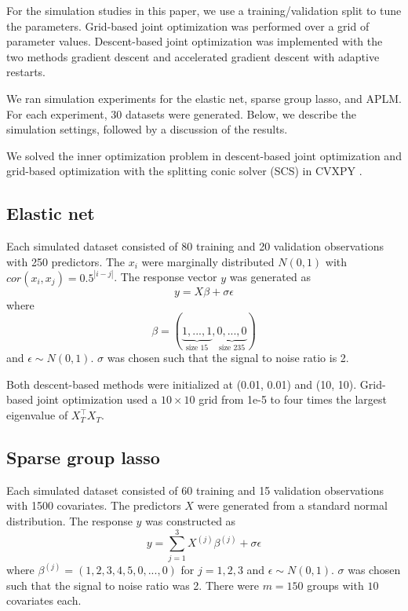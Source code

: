 \documentclass[10pt,letterpaper]{article}
\begin{document}
For the simulation studies in this paper, we use a training/validation split to tune the parameters. Grid-based joint optimization was performed over a grid of parameter values. Descent-based joint optimization was implemented with the two methods gradient descent and accelerated gradient descent with adaptive restarts.

We ran simulation experiments for the elastic net, sparse group lasso, and APLM. For each experiment, 30 datasets were generated. Below, we describe the simulation settings, followed by a discussion of the results.

We solved the inner optimization problem in descent-based joint optimization and grid-based optimization with the splitting conic solver (SCS) in CVXPY \citep{cvxpy}.

\subsection{Elastic net}
Each simulated dataset consisted of 80 training and 20 validation observations with 250 predictors. The $x_i$ were marginally distributed $N(0,1)$ with $cor(x_i,x_j) = 0.5^{|i-j|}$.
The response vector $y$ was generated as
\begin{equation}
y = X\beta + \sigma \epsilon
\end{equation}
where
\begin{equation}
\beta = (\underbrace{1, ..., 1}_\text{size 15}, \underbrace{0, ..., 0}_\text{size 235})
\end{equation}
and $\epsilon \sim N(0, 1)$. $\sigma$ was chosen such that the signal to noise ratio is 2. 

Both descent-based methods were initialized at (0.01, 0.01) and (10, 10). Grid-based joint optimization used a $10 \times 10$ grid from 1e-5 to four times the largest eigenvalue of $X_T^\top X_T$.

\subsection{Sparse group lasso}\label{sec:simulationSGL}

Each simulated dataset consisted of 60 training and 15 validation observations with 1500 covariates. The predictors $X$ were generated from a standard normal distribution. The response $y$ was constructed as
\begin{equation}
y = \sum\limits_{j=1}^3 X^{(j)} \beta^{(j)} + \sigma \epsilon
\end{equation}
where $\beta^{(j)} = (1, 2, 3, 4, 5, 0, ..., 0)$ for $j = 1, 2, 3$ and $\epsilon \sim N(0, 1)$. $\sigma$ was chosen such that the signal to noise ratio was 2. There were $m=150$ groups with $10$ covariates each.
\end{document}
